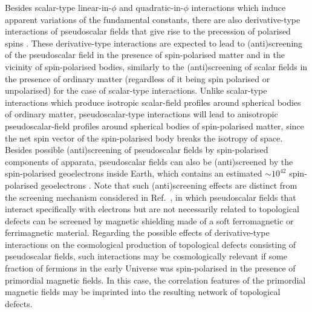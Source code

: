 \documentclass[aps,prd,onecolumn,nofootinbib]{revtex4-2} %
\begin{document}
Besides scalar-type linear-in-$\phi$ and quadratic-in-$\phi$ interactions which induce apparent variations of the fundamental constants, there are also derivative-type interactions of pseudoscalar fields that give rise to the precession of polarised spins \cite{Pospelov_2013_TDM-magnetometers,Stadnik_2014_axions}. 
These derivative-type interactions are expected to lead to (anti)screening of the pseudoscalar field in the presence of spin-polarised matter and in the vicinity of spin-polarised bodies, similarly to the (anti)screening of scalar fields in the presence of ordinary matter (regardless of it being spin polarised or unpolarised) for the case of scalar-type interactions. 
Unlike scalar-type interactions which produce isotropic scalar-field profiles around spherical bodies of ordinary matter, pseudoscalar-type interactions will lead to anisotropic pseudoscalar-field profiles around spherical bodies of spin-polarised matter, since the net spin vector of the spin-polarised body breaks the isotropy of space. 
Besides possible (anti)screening of pseudoscalar fields by spin-polarised components of apparata, pseudoscalar fields can also be (anti)screened by the spin-polarised geoelectrons inside Earth, which contains an estimated $\sim 10^{42}$ spin-polarised geoelectrons \cite{Hunter_2013_Geoelectrons-A,Hunter_2013_Geoelectrons-B}. 
Note that such (anti)screening effects are distinct from the screening mechanism considered in Ref.~\cite{Zolotorev_2016_Magnetic-screening}, in which pseudoscalar fields that interact specifically with electrons but are not necessarily related to topological defects can be screened by magnetic shielding made of a soft ferromagnetic or ferrimagnetic material. 
Regarding the possible effects of derivative-type interactions on the cosmological production of topological defects consisting of pseudoscalar fields, such interactions may be cosmologically relevant if some fraction of fermions in the early Universe was spin-polarised in the presence of primordial magnetic fields. 
In this case, the correlation features of the primordial magnetic fields may be imprinted into the resulting network of topological defects. 
\end{document}
